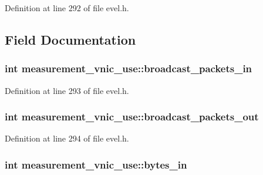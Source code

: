Definition at line 292 of file evel.\+h.



\subsection{Field Documentation}
\hypertarget{structmeasurement__vnic__use_a76118fde6433600cb7114a69fbfd024f}{}
\subsubsection[{broadcast\+\_\+packets\+\_\+in}]{\setlength{\rightskip}{0pt plus 5cm}int measurement\+\_\+vnic\+\_\+use\+::broadcast\+\_\+packets\+\_\+in}\label{structmeasurement__vnic__use_a76118fde6433600cb7114a69fbfd024f}


Definition at line 293 of file evel.\+h.

\hypertarget{structmeasurement__vnic__use_ab43fc257b8a2992991d20781f8e21ba9}{}
\subsubsection[{broadcast\+\_\+packets\+\_\+out}]{\setlength{\rightskip}{0pt plus 5cm}int measurement\+\_\+vnic\+\_\+use\+::broadcast\+\_\+packets\+\_\+out}\label{structmeasurement__vnic__use_ab43fc257b8a2992991d20781f8e21ba9}


Definition at line 294 of file evel.\+h.

\hypertarget{structmeasurement__vnic__use_ad6289ea98d480dfc89aff65304ac665c}{}
\subsubsection[{bytes\+\_\+in}]{\setlength{\rightskip}{0pt plus 5cm}int measurement\+\_\+vnic\+\_\+use\+::bytes\+\_\+in}\label{structmeasurement__vnic__use_ad6289ea98d480dfc89aff65304ac665c}


